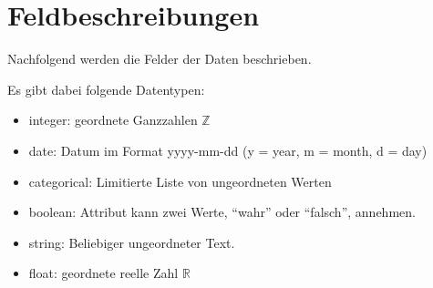 
\appendix
\chapter{Feldbeschreibungen}
\label{app:feldbeschreibungen}
Nachfolgend werden die Felder der Daten beschrieben.

Es gibt dabei folgende Datentypen:
\begin{itemize}
\item integer: geordnete Ganzzahlen $\mathbb{Z}$
\item date: Datum im Format yyyy-mm-dd (y = year, m = month, d = day)
\item categorical: Limitierte Liste von ungeordneten Werten
\item boolean: Attribut kann zwei Werte, "`wahr"' oder "`falsch"', annehmen. 
\item string: Beliebiger ungeordneter Text.
\item float: geordnete reelle Zahl $\mathbb{R}$
\end{itemize}

